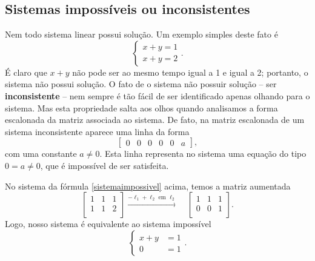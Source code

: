 \documentclass[../livro.tex]{subfiles} %
\begin{document}
\subsection{Sistemas impossíveis ou inconsistentes}

Nem todo sistema linear possui solução. Um exemplo simples deste fato é
\begin{equation}\label{sistemaimpossivel}
\left\{
  \begin{array}{ll}
    x+y = 1\\
    x+y = 2
  \end{array}
\right. .
\end{equation} É claro que $x+y$ não pode ser ao mesmo tempo igual a 1 e igual a 2; portanto, o sistema não possui solução. O fato de o sistema não possuir solução -- ser \textbf{inconsistente} -- nem sempre é tão fácil de ser identificado apenas olhando para o sistema. Mas esta propriedade salta aos olhos quando analisamos a forma escalonada da matriz associada ao sistema. De fato, na matriz escalonada de um sistema inconsistente aparece uma linha da forma
\begin{equation}
\left[
\begin{array}{ccccc|c}
   0&0&0&0&0&a
\end{array}
\right],
\end{equation} com uma constante $a \neq 0$. Esta linha representa no sistema uma equação do tipo $0 = a \neq 0$, que é impossível de ser satisfeita.

No sistema da fórmula \eqref{sistemaimpossivel} acima, temos a matriz aumentada
\begin{equation}
\left[
\begin{array}{cc|c}
   1 & 1 & 1 \\
   1 & 1 & 2 \\
\end{array}
\right]
\xrightarrow{-\ell_1 + \ell_2 \text{ em } \ell_2} \quad
\left[
\begin{array}{cc|c}
   1 & 1 & 1 \\
   0 & 0 & 1 \\
\end{array}
\right].
\end{equation} Logo, nosso sistema é equivalente ao sistema impossível
\begin{equation}
\left\{
  \begin{array}{rl}
    x+y &= 1\\
     0  &= 1
  \end{array}
\right. .
\end{equation}
\end{document}

